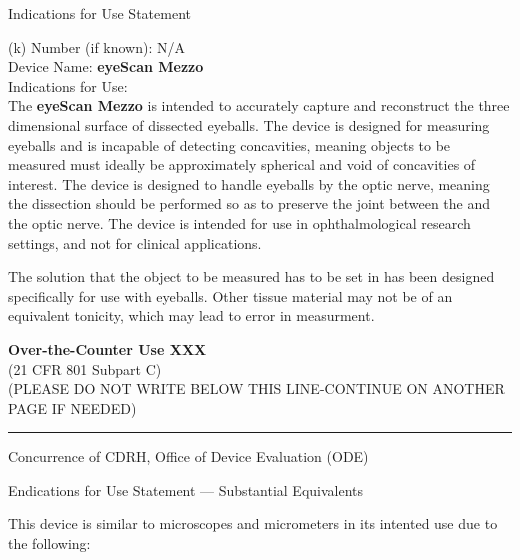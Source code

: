 \newpage
{}
\singlespacing
\begin{center}
  \large{Indications for Use Statement}
\end{center}

\onehalfspacing

(k) Number (if known): N/A \\
Device Name: \textbf{eyeScan Mezzo} \\
Indications for Use: \\

The \textbf{eyeScan Mezzo} is intended to accurately capture and
reconstruct the three dimensional surface of dissected eyeballs. The
device is designed for measuring eyeballs and is incapable of
detecting concavities, meaning objects to be measured must ideally be
approximately spherical and void of concavities of interest. The
device is designed to handle eyeballs by the optic nerve, meaning the
dissection should be performed so as to preserve the joint between the
and the optic nerve. The device is intended for use in
ophthalmological research settings, and not for clinical applications.

The solution that the object to be measured has to be set in has been
designed specifically for use with eyeballs. Other tissue material may
not be of an equivalent tonicity, which may lead to error in
measurment.

\vfill

\noindent \textbf{Over-the-Counter Use XXX} \\
(21 CFR 801 Subpart C)\\[1em]

\noindent (PLEASE DO NOT WRITE BELOW THIS LINE-CONTINUE ON ANOTHER PAGE IF
NEEDED)

\rule{\linewidth}{0.5mm}
\begin{center}
  Concurrence of CDRH, Office of Device Evaluation (ODE)
\end{center}

\vspace{5em}

\newpage
\singlespacing
{}
\begin{center}
  \large{Endications for Use Statement --- Substantial Equivalents}
\end{center}

\onehalfspacing

This device is similar to microscopes and micrometers in its intented
use due to the following:

